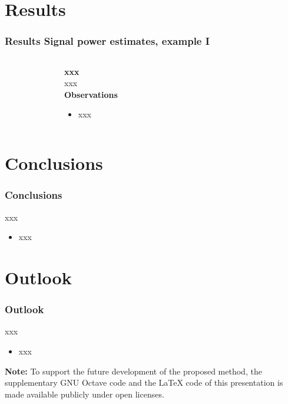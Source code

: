 \documentclass[11pt,aspectratio=169]{beamer}
\begin{document}
	\section{Results}
	\begin{frame}
		\frametitle{Results \textendash{} Signal power estimates, example I}
		\begin{columns}[t]
			\begin{RIPcolleft}
				\begin{figure}
				\end{figure}
			\end{RIPcolleft}
			\begin{RIPcolright}
				\textbf{xxx}\\
				xxx\\
				\vspace*{.5em}
				\textbf{Observations}\\
				\begin{itemize}
					\item xxx
				\end{itemize}
			\end{RIPcolright}
		\end{columns}
	\end{frame}
	\section{Conclusions}
	\begin{frame}
		\frametitle{Conclusions}
		xxx
		\vspace*{1em}
		\begin{itemize}
			\item xxx
		\end{itemize}
	\end{frame}
	\section{Outlook}
	\begin{frame}
		\frametitle{Outlook}
		xxx
		\vspace*{1em}
		\begin{itemize}
			\item xxx
		\end{itemize}
		\vspace*{.5em}
		\small \textbf{Note:} To support the future development of the proposed method, the supplementary GNU Octave code\autocite{progcode} and the \LaTeX{} code\autocite{texcode} of this presentation is made available publicly under open licenses.
	\end{frame}
\end{document}

